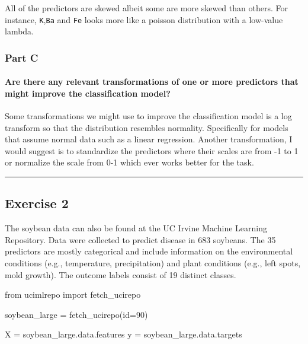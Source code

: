 \documentclass[
  11pt,
]{article}
\let\oldparagraph\paragraph
\renewcommand{\paragraph}[1]{\oldparagraph{#1}\mbox{}}
\newenvironment{Shaded}{\begin{snugshade}}{\end{snugshade}}
\newcommand{\BuiltInTok}[1]{\textcolor[rgb]{0.00,0.23,0.31}{#1}}
\newcommand{\DecValTok}[1]{\textcolor[rgb]{0.68,0.00,0.00}{#1}}
\newcommand{\ImportTok}[1]{\textcolor[rgb]{0.00,0.46,0.62}{#1}}
\newcommand{\NormalTok}[1]{\textcolor[rgb]{0.00,0.23,0.31}{#1}}
\newcommand{\OperatorTok}[1]{\textcolor[rgb]{0.37,0.37,0.37}{#1}}
\begin{document}
All of the predictors are skewed albeit some are more skewed than
others. For instance, \texttt{K},\texttt{Ba} and \texttt{Fe} looks more
like a poisson distribution with a low-value lambda.

\subsubsection{Part C}\label{part-c}

\paragraph{Are there any relevant transformations of one or more
predictors that might improve the classification
model?}\label{are-there-any-relevant-transformations-of-one-or-more-predictors-that-might-improve-the-classification-model}

Some transformations we might use to improve the classification model is
a log transform so that the distribution resembles normality.
Specifically for models that assume normal data such as a linear
regression. Another transformation, I would suggest is to standardize
the predictors where their scales are from -1 to 1 or normalize the
scale from 0-1 which ever works better for the task.

\begin{center}\rule{0.5\linewidth}{0.5pt}\end{center}

\subsection{Exercise 2}\label{exercise-2}

The soybean data can also be found at the UC Irvine Machine Learning
Repository. Data were collected to predict disease in 683 soybeans. The
35 predictors are mostly categorical and include information on the
environmental conditions (e.g., temperature, precipitation) and plant
conditions (e.g., left spots, mold growth). The outcome labels consist
of 19 distinct classes.

\begin{Shaded}
\begin{Highlighting}[]
\ImportTok{from}\NormalTok{ ucimlrepo }\ImportTok{import}\NormalTok{ fetch\_ucirepo }
  
\NormalTok{soybean\_large }\OperatorTok{=}\NormalTok{ fetch\_ucirepo(}\BuiltInTok{id}\OperatorTok{=}\DecValTok{90}\NormalTok{) }
  
\NormalTok{X }\OperatorTok{=}\NormalTok{ soybean\_large.data.features }
\NormalTok{y }\OperatorTok{=}\NormalTok{ soybean\_large.data.targets }
\end{Highlighting}
\end{Shaded}
\end{document}

